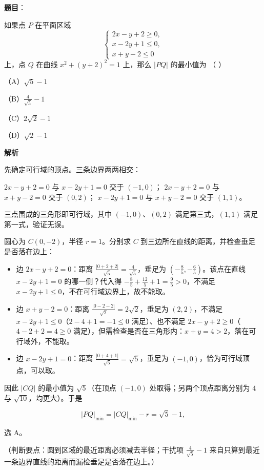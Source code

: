 \begin{answer}

\textbf{题目}：

如果点 $P$ 在平面区域
\nopagebreak[4]
\[\begin{cases}2x-y+2\geqslant0,\\ x-2y+1\leqslant0,\\ x+y-2\leqslant0\end{cases}\]
上，点 $Q$ 在曲线 $x^2+(y+2)^2=1$ 上，那么 $|PQ|$ 的最小值为 （ ）

（A）$\sqrt5-1$

（B）$\frac{4}{\sqrt5}-1$

（C）$2\sqrt2-1$

（D）$\sqrt2-1$

\textbf{解析}

先确定可行域的顶点。三条边界两两相交：

$2x-y+2=0$ 与 $x-2y+1=0$ 交于 $(-1,0)$；
$2x-y+2=0$ 与 $x+y-2=0$ 交于 $(0,2)$；
$x-2y+1=0$ 与 $x+y-2=0$ 交于 $(1,1)$。

三点围成的三角形即可行域，其中 $(-1,0)$、$(0,2)$ 满足第三式，$(1,1)$ 满足第一式，验证无误。

圆心为 $C(0,-2)$，半径 $r=1$。分别求 $C$ 到三边所在直线的距离，并检查垂足是否落在边上：

\begin{itemize}
\item 边 $2x-y+2=0$：距离 $\frac{|0+2+2|}{\sqrt5}=\frac{4}{\sqrt5}$，垂足为 $\left(-\frac85,-\frac65\right)$。该点在直线 $x-2y+1=0$ 的哪一侧？代入得 $-\frac85+\frac{12}5+1=\frac{9}{5}>0$，不满足 $x-2y+1\leqslant0$，不在可行域边界上，故不能取。
\item 边 $x+y-2=0$：距离 $\frac{|0-2-2|}{\sqrt2}=2\sqrt2$，垂足为 $(2,2)$，不满足 $x-2y+1\leqslant0$（$2-4+1=-1\leqslant0$ 满足）、也不满足 $2x-y+2\geqslant0$（$4-2+2=4\geqslant0$ 满足），但需检查是否在三角形内：$x+y=4>2$，落在可行域外，不能取。
\item 边 $x-2y+1=0$：距离 $\frac{|0+4+1|}{\sqrt5}=\sqrt5$，垂足为 $(-1,0)$，恰为可行域顶点，可以取。
\end{itemize}

因此 $|CQ|$ 的最小值为 $\sqrt5$（在顶点 $(-1,0)$ 处取得；另两个顶点距离分别为 $4$ 与 $\sqrt{10}$，均更大）。于是

\nopagebreak[4]
\[|PQ|_{\min}=|CQ|_{\min}-r=\sqrt5-1,\]

选 A。

（判断要点：圆到区域的最近距离必须减去半径；干扰项 $\frac{4}{\sqrt5}-1$ 来自只算到最近一条边界直线的距离而漏检垂足是否落在边上。）


\end{answer}
